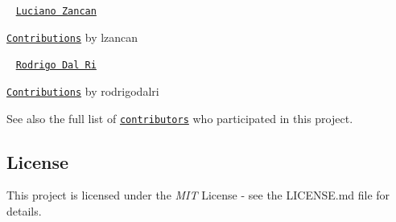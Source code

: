  ~\newline
 \href{https://github.com/lzancan}{\tt Luciano Zancan}  

\href{https://github.com/FranciscoKnebel/syncBox/commits?author=lzancan}{\tt Contributions} by lzancan   

 ~\newline
 \href{https://github.com/rodrigodalri}{\tt Rodrigo Dal Ri}  

\href{https://github.com/FranciscoKnebel/syncBox/commits?author=rodrigodalri}{\tt Contributions} by rodrigodalri   

See also the full list of \href{https://github.com/FranciscoKnebel/syncBox/contributors}{\tt contributors} who participated in this project.

\subsection*{License}

This project is licensed under the {\itshape M\+IT} License -\/ see the L\+I\+C\+E\+N\+SE.md file for details. 
